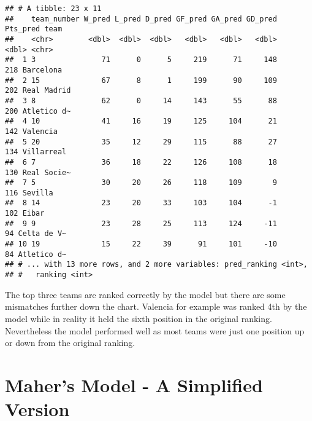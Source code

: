 \documentclass[
]{article}
\newenvironment{Shaded}{\begin{snugshade}}{\end{snugshade}}
\newcommand{\DecValTok}[1]{\textcolor[rgb]{0.00,0.00,0.81}{#1}}
\newcommand{\FunctionTok}[1]{\textcolor[rgb]{0.00,0.00,0.00}{#1}}
\newcommand{\NormalTok}[1]{#1}
\newcommand{\OtherTok}[1]{\textcolor[rgb]{0.56,0.35,0.01}{#1}}
\newcommand{\SpecialCharTok}[1]{\textcolor[rgb]{0.00,0.00,0.00}{#1}}
\newcommand{\StringTok}[1]{\textcolor[rgb]{0.31,0.60,0.02}{#1}}
\begin{document}
\begin{Shaded}
\end{Shaded}

\begin{verbatim}
## # A tibble: 23 x 11
##    team_number W_pred L_pred D_pred GF_pred GA_pred GD_pred Pts_pred team       
##    <chr>        <dbl>  <dbl>  <dbl>   <dbl>   <dbl>   <dbl>    <dbl> <chr>      
##  1 3               71      0      5     219      71     148      218 Barcelona  
##  2 15              67      8      1     199      90     109      202 Real Madrid
##  3 8               62      0     14     143      55      88      200 Atletico d~
##  4 10              41     16     19     125     104      21      142 Valencia   
##  5 20              35     12     29     115      88      27      134 Villarreal 
##  6 7               36     18     22     126     108      18      130 Real Socie~
##  7 5               30     20     26     118     109       9      116 Sevilla    
##  8 14              23     20     33     103     104      -1      102 Eibar      
##  9 9               23     28     25     113     124     -11       94 Celta de V~
## 10 19              15     22     39      91     101     -10       84 Atletico d~
## # ... with 13 more rows, and 2 more variables: pred_ranking <int>,
## #   ranking <int>
\end{verbatim}

The top three teams are ranked correctly by the model but there are some
mismatches further down the chart. Valencia for example was ranked 4th
by the model while in reality it held the sixth position in the original
ranking. Nevertheless the model performed well as most teams were just
one position up or down from the original ranking.

\hypertarget{mahers-model---a-simplified-version}{%
\section{Maher's Model - A Simplified
Version}\label{mahers-model---a-simplified-version}}
\end{document}
